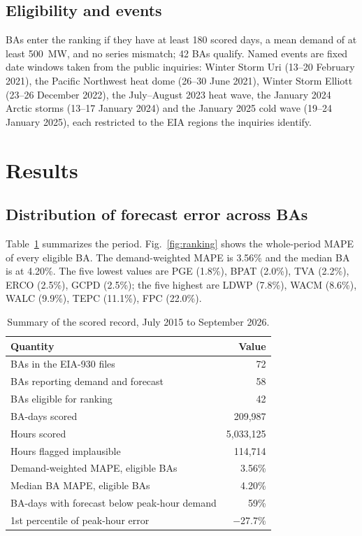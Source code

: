 \documentclass[conference]{IEEEtran}
\begin{document}
\subsection{Eligibility and events}
BAs enter the ranking if they have at least 180 scored days, a mean demand of at least 500~MW, and no series mismatch; 42 BAs qualify. Named events are fixed date windows taken from the public inquiries: Winter Storm Uri (13--20 February 2021), the Pacific Northwest heat dome (26--30 June 2021), Winter Storm Elliott (23--26 December 2022), the July--August 2023 heat wave, the January 2024 Arctic storms (13--17 January 2024) and the January 2025 cold wave (19--24 January 2025), each restricted to the EIA regions the inquiries identify.

\section{Results}
\subsection{Distribution of forecast error across BAs}
Table~\ref{tab:summary} summarizes the period. Fig.~\ref{fig:ranking} shows the whole-period MAPE of every eligible BA. The demand-weighted MAPE is 3.56\% and the median BA is at 4.20\%. The five lowest values are PGE (1.8\%), BPAT (2.0\%), TVA (2.2\%), ERCO (2.5\%), GCPD (2.5\%); the five highest are LDWP (7.8\%), WACM (8.6\%), WALC (9.9\%), TEPC (11.1\%), FPC (22.0\%).

\begin{table}[t]
\caption{Summary of the scored record, July 2015 to September 2026.}
\label{tab:summary}
\centering
\begin{tabular}{lr}
\toprule
Quantity & Value \\
\midrule
BAs in the EIA-930 files & 72 \\
BAs reporting demand and forecast & 58 \\
BAs eligible for ranking & 42 \\
BA-days scored & 209,987 \\
Hours scored & 5,033,125 \\
Hours flagged implausible & 114,714 \\
Demand-weighted MAPE, eligible BAs & 3.56\% \\
Median BA MAPE, eligible BAs & 4.20\% \\
BA-days with forecast below peak-hour demand & 59\% \\
1st percentile of peak-hour error & $-$27.7\% \\
\bottomrule
\end{tabular}
\end{table}
\end{document}
